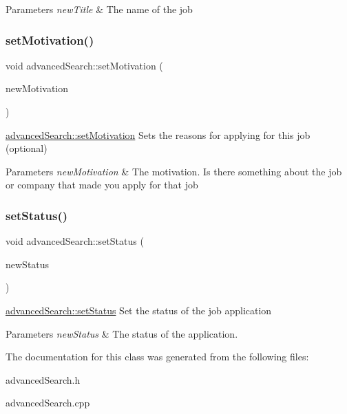 \begin{DoxyParams}{Parameters}
{\em new\+Title} & The name of the job \\
\hline
\end{DoxyParams}
\mbox{\label{classadvanced_search_a72e3b5ac068d875070165e865a03410c}} 
\subsubsection{\texorpdfstring{set\+Motivation()}{setMotivation()}}
{\footnotesize\ttfamily void advanced\+Search\+::set\+Motivation (\begin{DoxyParamCaption}\item[{Q\+String}]{new\+Motivation }\end{DoxyParamCaption})}



\mbox{\hyperlink{classadvanced_search_a72e3b5ac068d875070165e865a03410c}{advanced\+Search\+::set\+Motivation}} Sets the reasons for applying for this job (optional) 


\begin{DoxyParams}{Parameters}
{\em new\+Motivation} & The motivation. Is there something about the job or company that made you apply for that job \\
\hline
\end{DoxyParams}
\mbox{\label{classadvanced_search_a1530d628ce32b4c867349a075b3828c3}} 
\subsubsection{\texorpdfstring{set\+Status()}{setStatus()}}
{\footnotesize\ttfamily void advanced\+Search\+::set\+Status (\begin{DoxyParamCaption}\item[{Q\+String}]{new\+Status }\end{DoxyParamCaption})}



\mbox{\hyperlink{classadvanced_search_a1530d628ce32b4c867349a075b3828c3}{advanced\+Search\+::set\+Status}} Set the status of the job application 


\begin{DoxyParams}{Parameters}
{\em new\+Status} & The status of the application. \\
\hline
\end{DoxyParams}


The documentation for this class was generated from the following files\+:\begin{DoxyCompactItemize}
\item 
advanced\+Search.\+h\item 
advanced\+Search.\+cpp\end{DoxyCompactItemize}
